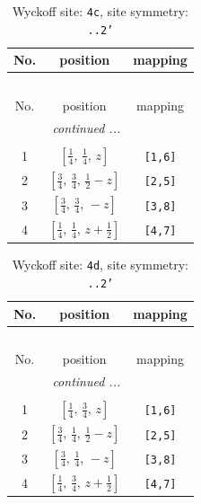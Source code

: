 \documentclass[fleqn,8pt]{jsarticle}
\begin{document}
\renewcommand{\arraystretch}{1.2}
\begin{longtable}{ccc}
\caption{Wyckoff site: {\tt 4c}, site symmetry: {\tt ..2'}}
 \\
 \hline \hline
No. & position & mapping \\ \hline \endfirsthead

\multicolumn{2}{l}{\tablename\ \thetable{}} \\
 \hline \hline
No. & position & mapping \\ \hline \endhead

 \hline \hline
\multicolumn{2}{r}{\footnotesize\it continued ...} \\ \endfoot

 \hline \hline
\multicolumn{2}{r}{} \\ \endlastfoot

1 & $\left[ \frac{1}{4},\, \frac{1}{4},\, z \right]$ & {\tt [1,6]} \\ \hline
2 & $\left[ \frac{3}{4},\, \frac{3}{4},\, \frac{1}{2} - z \right]$ & {\tt [2,5]} \\ \hline
3 & $\left[ \frac{3}{4},\, \frac{3}{4},\, - z \right]$ & {\tt [3,8]} \\ \hline
4 & $\left[ \frac{1}{4},\, \frac{1}{4},\, z + \frac{1}{2} \right]$ & {\tt [4,7]} \\
\end{longtable}
\renewcommand{\arraystretch}{1.2}
\begin{longtable}{ccc}
\caption{Wyckoff site: {\tt 4d}, site symmetry: {\tt ..2'}}
 \\
 \hline \hline
No. & position & mapping \\ \hline \endfirsthead

\multicolumn{2}{l}{\tablename\ \thetable{}} \\
 \hline \hline
No. & position & mapping \\ \hline \endhead

 \hline \hline
\multicolumn{2}{r}{\footnotesize\it continued ...} \\ \endfoot

 \hline \hline
\multicolumn{2}{r}{} \\ \endlastfoot

1 & $\left[ \frac{1}{4},\, \frac{3}{4},\, z \right]$ & {\tt [1,6]} \\ \hline
2 & $\left[ \frac{3}{4},\, \frac{1}{4},\, \frac{1}{2} - z \right]$ & {\tt [2,5]} \\ \hline
3 & $\left[ \frac{3}{4},\, \frac{1}{4},\, - z \right]$ & {\tt [3,8]} \\ \hline
4 & $\left[ \frac{1}{4},\, \frac{3}{4},\, z + \frac{1}{2} \right]$ & {\tt [4,7]} \\
\end{longtable}
\end{document}
